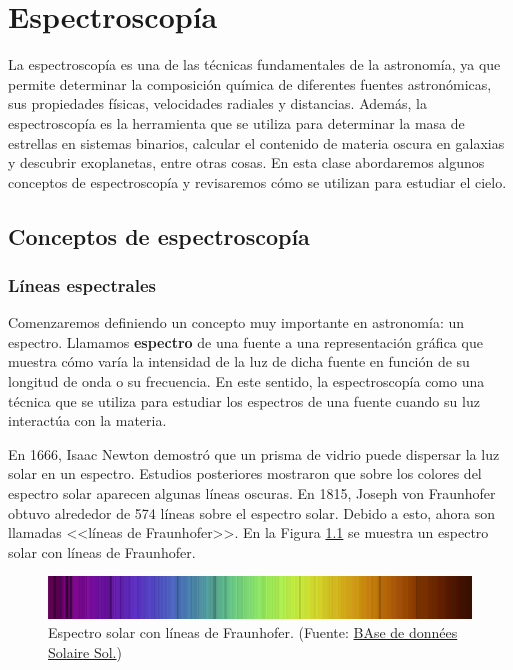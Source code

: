 \chapter{Espectroscopía}
La espectroscopía es una de las técnicas fundamentales de la astronomía, ya que permite determinar la composición química de diferentes fuentes astronómicas, sus propiedades físicas, velocidades radiales y distancias. Además, la espectroscopía es la herramienta que se utiliza para determinar la masa de estrellas en sistemas binarios, calcular el contenido de materia oscura en galaxias y descubrir exoplanetas, entre otras cosas. En esta clase abordaremos algunos conceptos de espectroscopía y revisaremos cómo se utilizan para estudiar el cielo. 

\section{Conceptos de espectroscopía}
\subsection{Líneas espectrales}
Comenzaremos definiendo un concepto muy importante en astronomía: un espectro. Llamamos \textbf{espectro} de una fuente a una representación gráfica que muestra cómo varía la intensidad de la luz de dicha fuente en función de su longitud de onda o su frecuencia. En este sentido, la espectroscopía como una técnica que se utiliza para estudiar los espectros de una fuente cuando su luz interactúa con la materia.

En 1666, Isaac Newton demostró que un prisma de vidrio puede dispersar la luz solar en un espectro. Estudios posteriores mostraron que sobre los colores del espectro solar aparecen algunas líneas oscuras. En 1815, Joseph von Fraunhofer obtuvo alrededor de 574 líneas sobre el espectro solar. Debido a esto, ahora son llamadas <<líneas de Fraunhofer>>. En la Figura \ref{fig:solar-spectrum} se muestra un espectro solar con líneas de Fraunhofer. 

\begin{figure}[htb]
  \centering
				\includegraphics[width=\textwidth]{figures/solar-spectrum.png}
				\caption{Espectro solar con líneas de Fraunhofer. (Fuente: \href{https://bass2000.obspm.fr/solar_spect.php}{BAse de données Solaire Sol.})}
				\label{fig:solar-spectrum} 
\end{figure}

